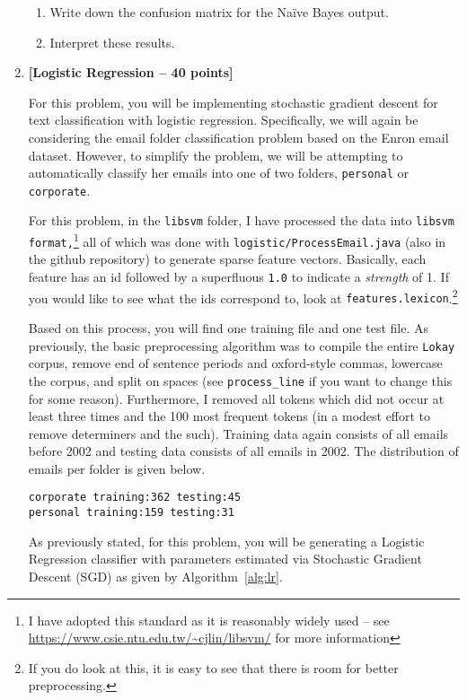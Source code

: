 \documentclass[12pt,letterpaper]{article}
\begin{document}
\begin{enumerate}
\begin{enumerate}
\item
Write down the confusion matrix for the Na\"{i}ve Bayes output.

\item
Interpret these results.

\end{enumerate}

\item
{\bf [Logistic Regression -- 40 points]}

For this problem, you will be implementing stochastic gradient descent for text classification with logistic regression.  Specifically, we will again be considering the email folder classification problem based on the Enron email dataset.  However, to simplify the problem, we will be attempting to automatically classify her emails into one of two folders, {\tt personal} or {\tt corporate}.

For this problem, in the {\tt libsvm} folder, I have processed the data into {\tt libsvm format,}\footnote{I have adopted this standard as it is reasonably widely used -- see \url{https://www.csie.ntu.edu.tw/~cjlin/libsvm/} for more information} all of which was done with {\tt logistic/ProcessEmail.java} (also in the github repository) to generate sparse feature vectors.  Basically, each feature has an id followed by a superfluous {\tt 1.0} to indicate a {\em strength} of 1.  If you would like to see what the ids correspond to, look at {\tt features.lexicon}.\footnote{If you do look at this, it is easy to see that there is room for better preprocessing.}

Based on this process, you will find one training file and one test file.
As previously, the basic preprocessing algorithm was to compile the entire {\tt Lokay} corpus, remove end of sentence periods and oxford-style commas, lowercase the corpus, and split on spaces (see {\tt process\_line} if you want to change this for some reason).  Furthermore, I removed all tokens which did not occur at least three times and the 100 most frequent tokens (in a modest effort to remove determiners and the such).  Training data again consists of all emails before 2002 and testing data consists of all emails in 2002.  The distribution of emails per folder is given below.

\begin{verbatim}
corporate training:362 testing:45
personal training:159 testing:31
\end{verbatim}

As previously stated, for this problem, you will be generating a Logistic Regression classifier with parameters estimated via Stochastic Gradient Descent (SGD) as given by Algorithm~\ref{alg:lr}.


\end{enumerate}
\end{document}
